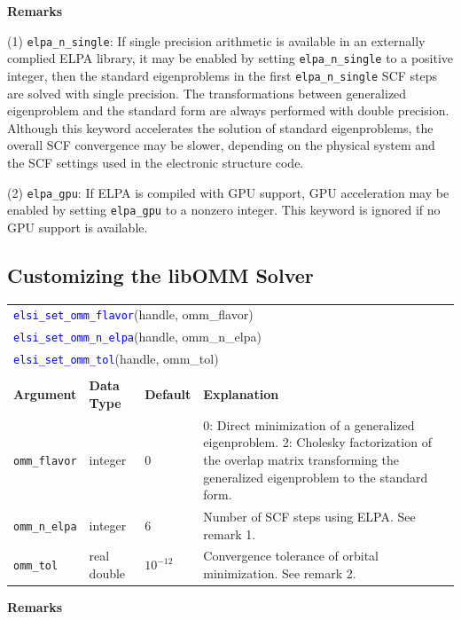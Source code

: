 \documentclass{report}
\newcommand{\api}[1]{\textcolor{blue}{\texttt{#1}}}
\begin{document}
\textbf{Remarks}

(1) \texttt{elpa\_n\_single}: If single precision arithmetic is available in an externally complied ELPA library, it may be enabled by setting \texttt{elpa\_n\_single} to a positive integer, then the standard eigenproblems in the first \texttt{elpa\_n\_single} SCF steps are solved with single precision. The transformations between generalized eigenproblem and the standard form are always performed with double precision. Although this keyword accelerates the solution of standard eigenproblems, the overall SCF convergence may be slower, depending on the physical system and the SCF settings used in the electronic structure code.

(2) \texttt{elpa\_gpu}: If ELPA is compiled with GPU support, GPU acceleration may be enabled by setting \texttt{elpa\_gpu} to a nonzero integer. This keyword is ignored if no GPU support is available.

\subsection{Customizing the libOMM Solver}
\label{subsec:setter_omm}
\begin{tabular}[]{|p{30mm}|p{20mm}|p{15mm}|p{97mm}|}
\multicolumn{4}{l}{\api{elsi\_set\_omm\_flavor}(handle, omm\_flavor)}\\
\multicolumn{4}{l}{\api{elsi\_set\_omm\_n\_elpa}(handle, omm\_n\_elpa)}\\
\multicolumn{4}{l}{\api{elsi\_set\_omm\_tol}(handle, omm\_tol)}\\
\multicolumn{4}{l}{}\\
\hline
\multicolumn{1}{|l|}{\textbf{Argument}} & \multicolumn{1}{l|}{\textbf{Data Type}} & \multicolumn{1}{l|}{\textbf{Default}} & \multicolumn{1}{l|}{\textbf{Explanation}}\\
\hline
\texttt{omm\_flavor}  & integer     & 0          & 0: Direct minimization of a generalized eigenproblem. 2: Cholesky factorization of the overlap matrix transforming the generalized eigenproblem to the standard form.\\
\hline
\texttt{omm\_n\_elpa} & integer     & 6          & Number of SCF steps using ELPA. See remark 1.\\
\hline
\texttt{omm\_tol}     & real double & $10^{-12}$ & Convergence tolerance of orbital minimization. See remark 2.\\
\hline
\end{tabular}

\textbf{Remarks}
\end{document}
